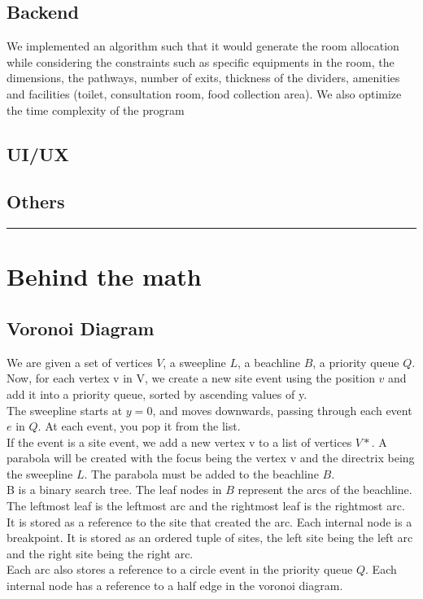 \documentclass{article}
\begin{document}
\subsection{Backend}
We implemented an algorithm such that it would generate the room allocation while considering the constraints such as specific equipments in the room, the dimensions, the pathways, number of exits, thickness of the dividers, amenities and facilities (toilet, consultation room, food collection area). We also optimize the time complexity of the program
\subsection{UI/UX} 
\subsection{Others}
\par\noindent\rule{\textwidth}{0.4pt}

\newpage
\section{Behind the math}
\subsection{Voronoi Diagram}
We are given a set of vertices \(V\), a sweepline \(L\), a beachline \(B\), a priority queue \(Q\).\\
Now, for each vertex v in V, we create a new site event using the position \(v\) and add it into a priority queue, sorted by ascending values of y. \\
The sweepline starts at \begin{math} y=0 \end{math}, and moves downwards, passing through each event \(e\) in \(Q\). 
At each event, you pop it from the list.\\
If the event is a site event, we add a new vertex v to a list of vertices \begin{math}V*\end{math}. A parabola will be created with the focus being the vertex v and the directrix being the sweepline \(L\). The parabola must be added to the beachline \(B\). \\
B is a binary search tree. The leaf nodes in \(B\) represent the arcs of the beachline. The leftmost leaf is the leftmost arc and the rightmost leaf is the rightmost arc. It is stored as a reference to the site that created the arc. Each internal node is a breakpoint. It is stored as an ordered tuple of sites, the left site being the left arc and the right site being the right arc.\\
Each arc also stores a reference to a circle event in the priority queue \(Q\). Each internal node has a reference to a half edge in the voronoi diagram.\\
\end{document}
